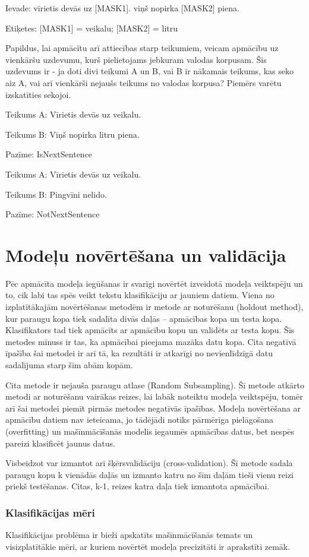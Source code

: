 Ievade: vīrietis devās uz [MASK1]. viņš nopirka [MASK2] piena.

Etiķetes: [MASK1] = veikalu; [MASK2] = litru

Papildus, lai apmācītu arī attiecības starp teikumiem, veicam apmācību uz vienkāršu uzdevumu, kurš pielietojams jebkuram valodas korpusam. Šis uzdevums ir - ja doti divi teikumi A un B, vai B ir nākamais teikums, kas seko aiz A, vai arī vienkārši nejaušs teikums no valodas korpusa? Piemērs varētu izskatīties sekojoi.

Teikums A: Vīrietis devās uz veikalu.

Teikums B: Viņš nopirka litru piena.

Pazīme: IsNextSentence

Teikums A: Vīrietis devās uz veikalu.

Teikums B: Pingvīni nelido.

Pazīme: NotNextSentence

\section{Modeļu novērtēšana un validācija}
Pēc apmācīta modeļa iegūšanas ir svarīgi novērtēt izveidotā modeļa veiktspēju un to, cik labi tas spēs veikt tekstu klasifikāciju ar jauniem datiem. 
Viena no izplatītākajām novērtēšanas metodēm ir metode ar noturēšanu (holdout method), kur paraugu kopa tiek sadalīta divās daļās – apmācības kopa un testa kopa. Klasifikators tad tiek apmācīts ar apmācību kopu un validēts ar testa kopu. Šīs metodes mīnuss ir tas, ka apmācībai pieejama mazāka datu kopa. Cita negatīvā īpašība šai metodei ir arī tā, ka rezultāti ir atkarīgi no nevienlīdzīgā datu sadalījuma starp šīm abām kopām.

Cita metode ir nejauša paraugu atlase (Random Subsampling). Šī metode atkārto metodi ar noturēšanu vairākas reizes, lai labāk noteiktu modeļa veiktspēju, tomēr arī šai metodei piemīt pirmās metodes negatīvās īpašības.
Modeļa novērtēšana ar apmācību datiem nav ieteicama, jo tādējādi notiks pārmērīga pielāgošana (overfitting) un mašīnmācīšanās modelis iegaumēs apmācības datus, bet nespēs pareizi klasificēt jaunus datus.

Visbeidzot var izmantot arī šķērsvalidāciju (cross-validation). Šī metode sadala paraugu kopu k vienādās daļās un izmanto katru no šīm daļām tieši vienu reizi priekš testēšanas.  Citas, k-1, reizes katra daļa tiek izmantota apmācībai.

\subsubsection{Klasifikācijas mēri}
\renewcommand{\theequation}{2.\arabic{equation}}
Klasifikācijas problēma ir bieži apskatīts mašīnmācīšanās temats un visizplatītākie mēri, ar kuriem novērtēt modeļa precizitāti ir aprakstīti zemāk.

